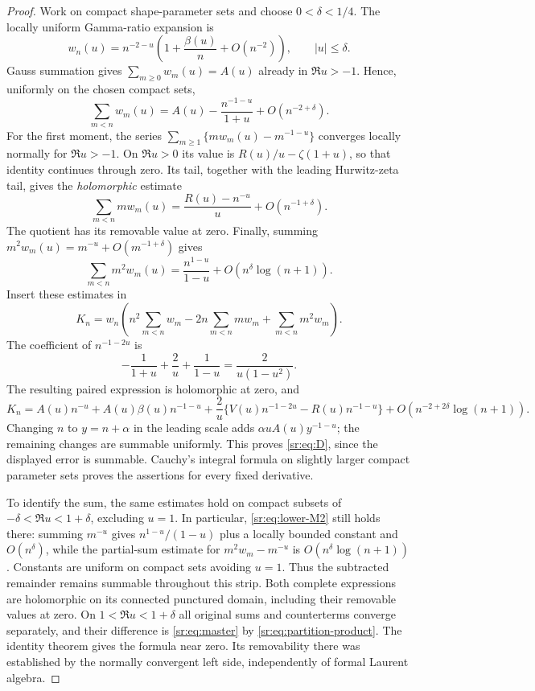 \begin{proof}
Work on compact shape-parameter sets and choose $0<\delta<1/4$.
The locally uniform Gamma-ratio expansion \cite[5.11.13]{dlmfgammaratio}
is
\begin{equation}\label{sr:eq:w-asymptotic}
 w_n(u)=n^{-2-u}\left(1+\frac{\beta(u)}n+O(n^{-2})\right),
 \qquad |u|\le\delta.
\end{equation}
Gauss summation gives $\sum_{m\ge0}w_m(u)=A(u)$ already in
$\Re u>-1$. Hence, uniformly on the chosen compact sets,
\begin{equation}\label{sr:eq:lower-M0}
 \sum_{m<n}w_m(u)=A(u)-\frac{n^{-1-u}}{1+u}+O(n^{-2+\delta}).
\end{equation}
For the first moment, the series
$\sum_{m\ge1}\{mw_m(u)-m^{-1-u}\}$ converges locally normally for
$\Re u>-1$. On $\Re u>0$ its value is $R(u)/u-\zeta(1+u)$, so that
identity continues through zero. Its tail, together with the leading
Hurwitz-zeta tail, gives the \emph{holomorphic} estimate
\begin{equation}\label{sr:eq:lower-M1}
 \sum_{m<n}mw_m(u)=\frac{R(u)-n^{-u}}u+O(n^{-1+\delta}).
\end{equation}
The quotient has its removable value at zero. Finally, summing
$m^2w_m(u)=m^{-u}+O(m^{-1+\delta})$ gives
\begin{equation}\label{sr:eq:lower-M2}
 \sum_{m<n}m^2w_m(u)=\frac{n^{1-u}}{1-u}
 +O(n^\delta\log(n+1)).
\end{equation}
Insert these estimates in
\[
 K_n=w_n\left(n^2\sum_{m<n}w_m-2n\sum_{m<n}mw_m
                         +\sum_{m<n}m^2w_m\right).
\]
The coefficient of $n^{-1-2u}$ is
\[
 -\frac1{1+u}+\frac2u+\frac1{1-u}
 =\frac{2}{u(1-u^2)}.
\]
The resulting paired expression is holomorphic at zero, and
\[
 K_n=A(u)n^{-u}+A(u)\beta(u)n^{-1-u}
 +\frac2u\{V(u)n^{-1-2u}-R(u)n^{-1-u}\}
 +O(n^{-2+2\delta}\log(n+1)).
\]
Changing $n$ to $y=n+\alpha$ in the leading scale adds
$\alpha uA(u)y^{-1-u}$; the remaining changes are summable uniformly.
This proves \eqref{sr:eq:D}, since the displayed error is summable.
Cauchy's integral formula on slightly larger compact parameter sets
proves the assertions for every fixed derivative.

To identify the sum, the same estimates hold on compact subsets of
$-\delta<\Re u<1+\delta$, excluding $u=1$. In particular,
\eqref{sr:eq:lower-M2} still holds there: summing $m^{-u}$ gives
$n^{1-u}/(1-u)$ plus a locally bounded constant and
$O(n^\delta)$, while the partial-sum estimate for
$m^2w_m-m^{-u}$ is $O(n^\delta\log(n+1))$. Constants are uniform
on compact sets avoiding $u=1$. Thus the subtracted remainder remains
summable throughout this strip. Both complete expressions are
holomorphic on its connected punctured domain, including their
removable values at zero.
On $1<\Re u<1+\delta$ all original sums and counterterms converge
separately, and their difference is \eqref{sr:eq:master} by
\eqref{sr:eq:partition-product}. The identity theorem gives the
formula near zero. Its removability there was established by the
normally convergent left side, independently of formal Laurent algebra.
\end{proof}


